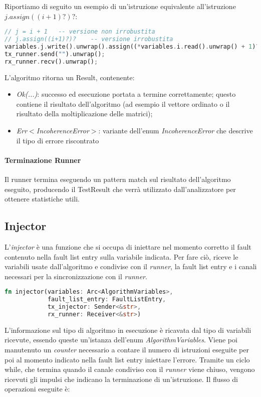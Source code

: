 Riportiamo di seguito un esempio di un'istruzione equivalente all'istruzione $j.assign((i+1)?)?$:
\begin{lstlisting}[language=Rust, style=boxed]
// j = i + 1   -- versione non irrobustita
// j.assign((i+1)?)?    -- versione irrobustita
variables.j.write().unwrap().assign((*variables.i.read().unwrap() + 1)?)?;
tx_runner.send("").unwrap();
rx_runner.recv().unwrap();
\end{lstlisting}

L'algoritmo ritorna un Result, contenente:
\begin{itemize}
    \item \textit{Ok(...)}: successo ed esecuzione portata a termine correttamente; questo contiene il risultato dell'algoritmo (ad esempio il vettore ordinato o il risultato della moltiplicazione delle matrici);
    \item \textit{Err$<$IncoherenceError$>$}: variante dell'enum \textit{IncoherenceError} che descrive il tipo di errore riscontrato 
\end{itemize}

\paragraph{Terminazione Runner}
Il runner termina eseguendo un pattern match sul risultato dell'algoritmo eseguito, producendo il TestResult che verrà utilizzato dall'analizzatore per ottenere statistiche utili.

\subsection{Injector}
L'\textit{injector} è una funzione che si occupa di iniettare nel momento corretto il fault contenuto nella fault list entry sulla variabile indicata. Per fare ciò, riceve le variabili usate dall'algoritmo e condivise con il \textit{runner}, la fault list entry e i canali necessari per la sincronizzazione con il \textit{runner}.

\begin{lstlisting}[language=Rust, style=boxed]
fn injector(variables: Arc<AlgorithmVariables>, 
            fault_list_entry: FaultListEntry,
            tx_injector: Sender<&str>,
            rx_runner: Receiver<&str>)
\end{lstlisting}

L'informazione sul tipo di algoritmo in esecuzione è ricavata dal tipo di variabili ricevute, essendo queste un'istanza dell'enum \textit{AlgorithmVariables}. Viene poi manutenuto un \textit{counter} necessario a contare il numero di istruzioni eseguite per poi al momento indicato nella fault list entry iniettare l'errore. Tramite un ciclo while, che termina quando il canale condiviso con il \textit{runner} viene chiuso, vengono ricevuti gli impulsi che indicano la terminazione di un'istruzione. Il flusso di operazioni eseguite è: 

